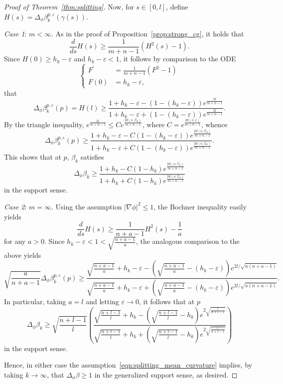 \documentclass{amsart}
\theoremstyle{definition}
\theoremstyle{remark}
\numberwithin{equation}{section}
\begin{document}
\begin{proof}[Proof of Theorem~\ref{thm:splitting}]
Now, for $s\in[0,l]$, define $H(s)=\Delta_\phi\beta_k^{p,\varepsilon}\left(\gamma(s)\right)$.

\emph{Case 1}: $m<\infty$.  As in the proof of Proposition~\ref{prop:strong_cg}, it holds that
\[ \frac{d}{ds}H(s) \geq \frac{1}{m+n-1}\left(H^2(s)-1\right) . \]
Since $H(0)\geq h_k-\varepsilon$ and $h_k-\varepsilon<1$, it follows by comparison to the ODE
\[ \begin{cases}
     F^\prime & = \frac{1}{m+n-1}\left(F^2-1\right) \\
     F(0) & = h_k-\varepsilon,
  \end{cases} \]
that
\[ \Delta_\phi\beta_k^{p,\varepsilon}(p) = H(l) \geq \frac{1+h_k-\varepsilon-(1-(h_k-\varepsilon))e^{\frac{2l}{m+n-1}}}{1+h_k-\varepsilon+(1-(h_k-\varepsilon))e^{\frac{2l}{m+n-1}}} . \]
By the triangle inequality, $e^{\frac{2l}{m+n-1}}\leq Ce^{\frac{2d(o,\Sigma_k)}{m+n-1}}$, where $C=e^\frac{2d(o,x)}{m+n-1}$, whence
\[ \Delta_\phi\beta_k^{p,\varepsilon}(p) \geq \frac{1+h_k-\varepsilon-C(1-(h_k-\varepsilon))e^{\frac{2d(o,\Sigma_k)}{m+n-1}}}{1+h_k-\varepsilon+C(1-(h_k-\varepsilon))e^{\frac{2d(o,\Sigma_k)}{m+n-1}}} . \]
This shows that at $p$, $\beta_k$ satisfies
\[ \Delta_\phi\beta_k\geq\frac{1+h_k-C(1-h_k)e^{\frac{2d(o,\Sigma_k)}{m+n-1}}}{1+h_k+C(1-h_k)e^{\frac{2d(o,\Sigma_k)}{m+n-1}}} \]
in the support sense.

\emph{Case 2}: $m=\infty$.  Using the assumption ${\lvert}\nabla\phi{\rvert}^2\leq1$, the Bochner inequality easily yields
\[ \frac{d}{ds}H(s) \geq \frac{1}{n+a-1}H^2(s) - \frac{1}{a} \]
for any $a>0$.  Since $h_k-\varepsilon<1<\sqrt{\frac{n+a-1}{a}}$, the analogous comparison to the above yields
\[ \sqrt{\frac{a}{n+a-1}} \Delta_\phi\beta_k^{p,\varepsilon}(p) \geq \frac{ \sqrt{\frac{n+a-1}{a}}+h_k-\varepsilon - \left(\sqrt{\frac{n+a-1}{a}}-(h_k-\varepsilon)\right) e^{2l/\sqrt{a(n+a-1)}} }{ \sqrt{\frac{n+a-1}{a}} + h_k-\varepsilon + \left(\sqrt{\frac{n+a-1}{a}} - (h_k-\varepsilon)\right)e^{2l/\sqrt{a(n+a-1)}} } . \]
In particular, taking $a=l$ and letting $\varepsilon\to0$, it follows that at $p$
\[ \Delta_\phi\beta_k\geq\sqrt{\frac{n+l-1}{l}}\left(\frac{ \sqrt{\frac{n+l-1}{l}}+h_k-\left(\sqrt{\frac{n+l-1}{l}}-h_k\right) e^{2\sqrt{\frac{l}{n+l-1}}} }{ \sqrt{\frac{n+l-1}{l}} + h_k + \left(\sqrt{\frac{n+l-1}{l}} - h_k\right)e^{2\sqrt{\frac{l}{n+l-1}}} }\right) \]
in the support sense.

Hence, in either case the assumption~\eqref{eqn:splitting_mean_curvature} implies, by taking $k\to\infty$, that $\Delta_\phi\beta\geq1$ in the generalized support sense, as desired.


\end{proof}
\end{document}
